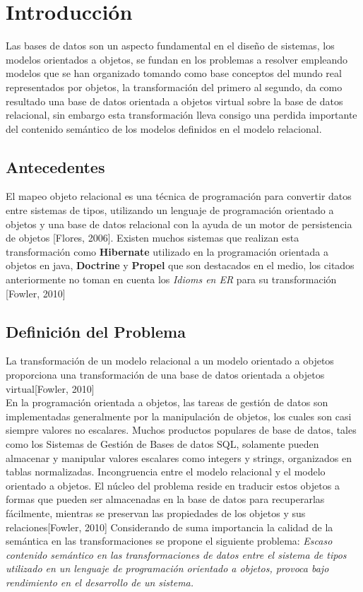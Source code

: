 
\chapter{Introducción}
\noindent Las bases de datos son un aspecto fundamental en el diseño de sistemas, los modelos orientados a objetos,
\noindent se fundan en los problemas a resolver empleando modelos que se han organizado tomando
\noindent como base conceptos del mundo real representados por objetos, la transformación del primero al segundo,
\noindent da como resultado una base de datos orientada a objetos virtual sobre la base de datos relacional,
\noindent sin embargo esta transformación lleva consigo una perdida importante del contenido semántico de los modelos
\noindent definidos en el modelo relacional.
\section{Antecedentes}
\noindent El mapeo objeto relacional es una técnica de programación para convertir datos entre sistemas de tipos,
\noindent utilizando un lenguaje de programación orientado a objetos y una base de datos relacional con la ayuda de un motor
\noindent de persistencia de objetos [Flores, 2006].
\noindent Existen muchos sistemas que realizan esta transformación como \textbf{Hibernate} utilizado en la programación
\noindent orientada a objetos en java, \textbf{Doctrine} y \textbf{Propel} que son destacados en el medio,
\noindent los citados anteriormente no toman en cuenta los \textit{Idioms en ER} para su transformación [Fowler, 2010]\\
\section{Definición del Problema}
\noindent La transformación de un modelo relacional a un modelo orientado a objetos proporciona una transformación de una
\noindent base de datos orientada a objetos virtual[Fowler, 2010] \\
\noindent En la programación orientada a objetos, las tareas de gestión de datos son implementadas generalmente por la
\noindent manipulación de objetos, los cuales son casi siempre valores no escalares.
\noindent Muchos productos populares de base de datos, tales como los Sistemas de Gestión de Bases de datos SQL, solamente
\noindent pueden almacenar y manipular valores escalares como integers y strings, organizados en tablas normalizadas.
\noindent Incongruencia entre el modelo relacional y el modelo orientado a objetos. El núcleo del problema reside en traducir
\noindent estos objetos a formas que pueden ser almacenadas en la base de datos para recuperarlas fácilmente, mientras se
\noindent preservan las propiedades de los objetos y sus relaciones[Fowler, 2010]
\noindent Considerando de  suma importancia la calidad de la semántica en las transformaciones se propone el siguiente problema:
\noindent \texbf\textit{Escaso contenido semántico en las transformaciones de datos entre el sistema de tipos utilizado
\noindent en un lenguaje de programación orientado a objetos, provoca bajo rendimiento en el desarrollo de un sistema.}

